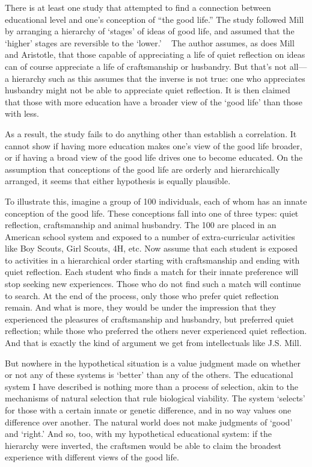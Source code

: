 There is at least one study that attempted to find a connection between educational level and one's conception of ``the good life.'' The study followed Mill by arranging a hierarchy of `stages' of ideas of good life, and assumed that the `higher' stages are reversible to the `lower.' ~\citep{Armon:2007vu} The author assumes, as does Mill and Aristotle, that those capable of appreciating a life of quiet reflection on ideas can of course appreciate a life of craftsmanship or husbandry. But that's not all---a hierarchy such as this assumes that the inverse is not true: one who appreciates husbandry might not be able to appreciate quiet reflection. It is then claimed that those with more education have a broader view of the `good life' than those with less.

As a result, the study fails to do anything other than establish a correlation. It cannot show if having more education makes one's view of the good life broader, or if having a broad view of the good life drives one to become educated. On the assumption that conceptions of the good life are orderly and hierarchically arranged, it seems that either hypothesis is equally plausible. 

To illustrate this, imagine a group of 100 individuals, each of whom has an innate conception of the good life. These conceptions fall into one of three types: quiet reflection, craftsmanship and animal husbandry. The 100 are placed in an American school system and exposed to a number of extra-curricular activities like Boy Scouts, Girl Scouts, 4H, etc. Now assume that each student is exposed to activities in a hierarchical order starting with craftsmanship and ending with quiet reflection. Each student who finds a match for their innate preference will stop seeking new experiences. Those who do not find such a match will continue to search. At the end of the process, only those who prefer quiet reflection remain. And what is more, they would be under the impression that they experienced the pleasures of craftsmanship and husbandry, but preferred quiet reflection; while those who preferred the others never experienced quiet reflection. And that is exactly the kind of argument we get from intellectuals like J.S. Mill.

But nowhere in the hypothetical situation is a value judgment made on whether or not any of these systems is `better' than any of the others. The educational system I have described is nothing more than a process of selection, akin to the mechanisms of natural selection that rule biological viability. The system `selects' for those with a certain innate or genetic difference, and in no way values one difference over another. The natural world does not make judgments of `good' and `right.' And so, too, with my hypothetical educational system: if the hierarchy were inverted, the craftsmen would be able to claim the broadest experience with different views of the good life.

